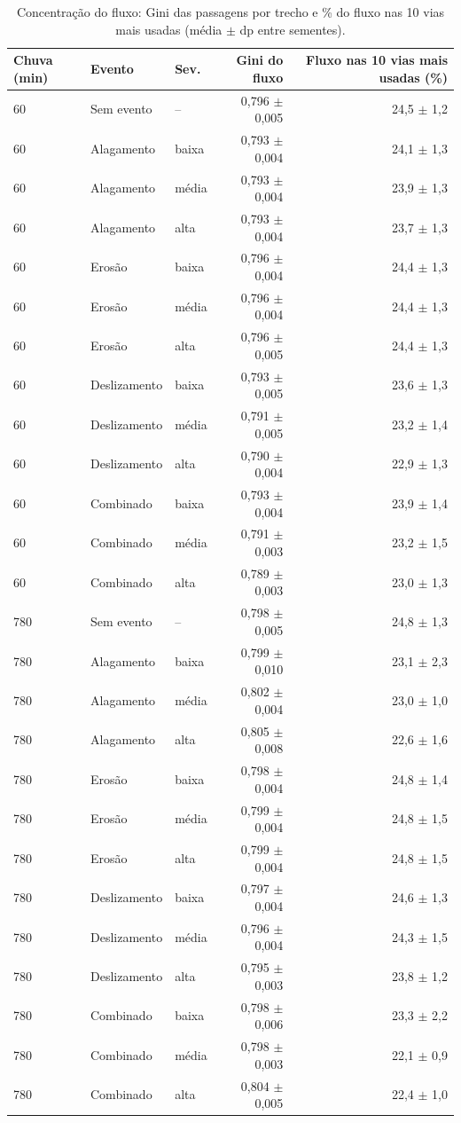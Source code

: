 \begin{table}[htbp]
\centering
\scriptsize
\caption{Concentração do fluxo: Gini das passagens por trecho e \% do fluxo nas 10 vias mais usadas (média $\pm$ dp entre sementes).}
\label{tab:t5}
\begin{tabular}{lllrr}
\toprule
Chuva (min) & Evento & Sev. & Gini do fluxo & Fluxo nas 10 vias mais usadas (\%) \\
\midrule
60 & Sem evento & -- & 0,796 $\pm$ 0,005 & 24,5 $\pm$ 1,2 \\
60 & Alagamento & baixa & 0,793 $\pm$ 0,004 & 24,1 $\pm$ 1,3 \\
60 & Alagamento & média & 0,793 $\pm$ 0,004 & 23,9 $\pm$ 1,3 \\
60 & Alagamento & alta & 0,793 $\pm$ 0,004 & 23,7 $\pm$ 1,3 \\
60 & Erosão & baixa & 0,796 $\pm$ 0,004 & 24,4 $\pm$ 1,3 \\
60 & Erosão & média & 0,796 $\pm$ 0,004 & 24,4 $\pm$ 1,3 \\
60 & Erosão & alta & 0,796 $\pm$ 0,005 & 24,4 $\pm$ 1,3 \\
60 & Deslizamento & baixa & 0,793 $\pm$ 0,005 & 23,6 $\pm$ 1,3 \\
60 & Deslizamento & média & 0,791 $\pm$ 0,005 & 23,2 $\pm$ 1,4 \\
60 & Deslizamento & alta & 0,790 $\pm$ 0,004 & 22,9 $\pm$ 1,3 \\
60 & Combinado & baixa & 0,793 $\pm$ 0,004 & 23,9 $\pm$ 1,4 \\
60 & Combinado & média & 0,791 $\pm$ 0,003 & 23,2 $\pm$ 1,5 \\
60 & Combinado & alta & 0,789 $\pm$ 0,003 & 23,0 $\pm$ 1,3 \\
780 & Sem evento & -- & 0,798 $\pm$ 0,005 & 24,8 $\pm$ 1,3 \\
780 & Alagamento & baixa & 0,799 $\pm$ 0,010 & 23,1 $\pm$ 2,3 \\
780 & Alagamento & média & 0,802 $\pm$ 0,004 & 23,0 $\pm$ 1,0 \\
780 & Alagamento & alta & 0,805 $\pm$ 0,008 & 22,6 $\pm$ 1,6 \\
780 & Erosão & baixa & 0,798 $\pm$ 0,004 & 24,8 $\pm$ 1,4 \\
780 & Erosão & média & 0,799 $\pm$ 0,004 & 24,8 $\pm$ 1,5 \\
780 & Erosão & alta & 0,799 $\pm$ 0,004 & 24,8 $\pm$ 1,5 \\
780 & Deslizamento & baixa & 0,797 $\pm$ 0,004 & 24,6 $\pm$ 1,3 \\
780 & Deslizamento & média & 0,796 $\pm$ 0,004 & 24,3 $\pm$ 1,5 \\
780 & Deslizamento & alta & 0,795 $\pm$ 0,003 & 23,8 $\pm$ 1,2 \\
780 & Combinado & baixa & 0,798 $\pm$ 0,006 & 23,3 $\pm$ 2,2 \\
780 & Combinado & média & 0,798 $\pm$ 0,003 & 22,1 $\pm$ 0,9 \\
780 & Combinado & alta & 0,804 $\pm$ 0,005 & 22,4 $\pm$ 1,0 \\
\bottomrule
\end{tabular}
\end{table}
